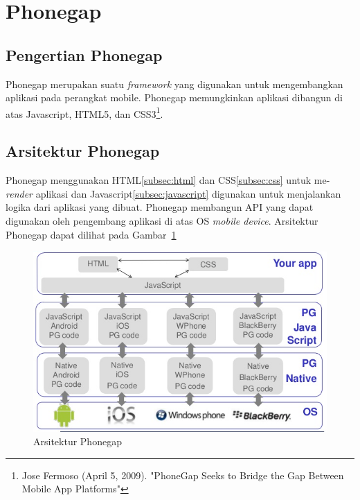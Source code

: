\section{Phonegap}
\label{sec:phonegap}

\subsection{Pengertian Phonegap}
\label{sec:pengertianphonegap}

Phonegap merupakan suatu \textit{framework} yang digunakan untuk mengembangkan aplikasi pada perangkat mobile. Phonegap memungkinkan aplikasi dibangun di atas Javascript, HTML5, dan CSS3\footnote{Jose Fermoso (April 5, 2009). "PhoneGap Seeks to Bridge the Gap Between Mobile App Platforms"}.

\subsection{Arsitektur Phonegap}
\label{sec:arsitekturphoengap}

Phonegap menggunakan HTML\ref{subsec:html} dan CSS\ref{subsec:css} untuk me-\textit{render} aplikasi dan Javascript\ref{subsec:javascript} digunakan untuk menjalankan logika dari aplikasi yang dibuat. Phonegap membangun API yang dapat digunakan oleh pengembang aplikasi di atas OS \textit{mobile device}. Arsitektur Phonegap dapat dilihat pada Gambar~\ref{fig:arsitektur_phonegap} 

\begin{figure}[!h]
\centering
\includegraphics[scale=0.65]{Gambar/phonegap-architecture}
\caption[Arsitektur Phonegap]{Arsitektur Phonegap} 
\label{fig:arsitektur_phonegap}
\end{figure}

